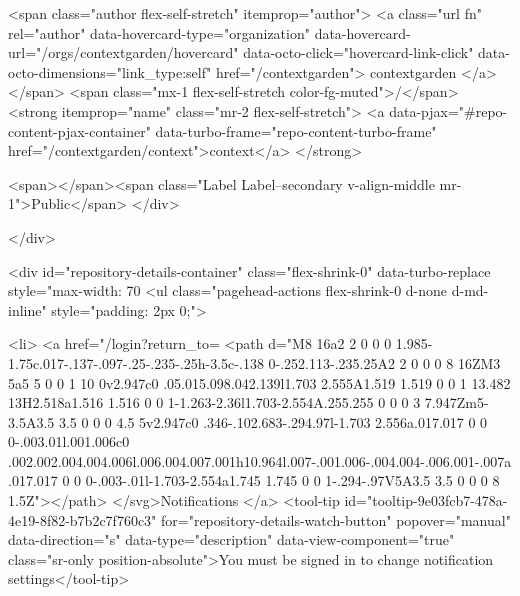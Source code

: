     <span class="author flex-self-stretch" itemprop="author">
      <a class="url fn" rel="author" data-hovercard-type="organization" data-hovercard-url="/orgs/contextgarden/hovercard" data-octo-click="hovercard-link-click" data-octo-dimensions="link_type:self" href="/contextgarden">
        contextgarden
</a>    </span>
    <span class="mx-1 flex-self-stretch color-fg-muted">/</span>
    <strong itemprop="name" class="mr-2 flex-self-stretch">
      <a data-pjax="#repo-content-pjax-container" data-turbo-frame="repo-content-turbo-frame" href="/contextgarden/context">context</a>
    </strong>

    <span></span><span class="Label Label--secondary v-align-middle mr-1">Public</span>
  </div>


        </div>

        <div id="repository-details-container" class="flex-shrink-0" data-turbo-replace style="max-width: 70%
            <ul class="pagehead-actions flex-shrink-0 d-none d-md-inline" style="padding: 2px 0;">
    
      

  <li>
            <a href="/login?return_to=%
    <path d="M8 16a2 2 0 0 0 1.985-1.75c.017-.137-.097-.25-.235-.25h-3.5c-.138 0-.252.113-.235.25A2 2 0 0 0 8 16ZM3 5a5 5 0 0 1 10 0v2.947c0 .05.015.098.042.139l1.703 2.555A1.519 1.519 0 0 1 13.482 13H2.518a1.516 1.516 0 0 1-1.263-2.36l1.703-2.554A.255.255 0 0 0 3 7.947Zm5-3.5A3.5 3.5 0 0 0 4.5 5v2.947c0 .346-.102.683-.294.97l-1.703 2.556a.017.017 0 0 0-.003.01l.001.006c0 .002.002.004.004.006l.006.004.007.001h10.964l.007-.001.006-.004.004-.006.001-.007a.017.017 0 0 0-.003-.01l-1.703-2.554a1.745 1.745 0 0 1-.294-.97V5A3.5 3.5 0 0 0 8 1.5Z"></path>
</svg>Notifications
</a>    <tool-tip id="tooltip-9e03fcb7-478a-4e19-8f82-b7b2c7f760c3" for="repository-details-watch-button" popover="manual" data-direction="s" data-type="description" data-view-component="true" class="sr-only position-absolute">You must be signed in to change notification settings</tool-tip>

